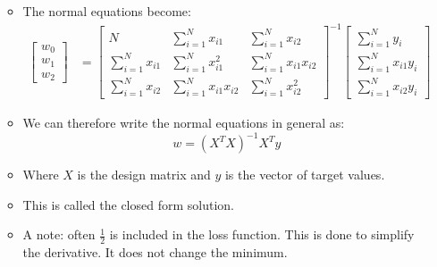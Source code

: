 \documentclass[12pt]{article}
\begin{document}
\begin{itemize}
\begin{itemize}
\begin{equation}
                        \end{equation}
                        \item The normal equations become:
                        \begin{align*}
                            \begin{bmatrix}
                                w_0\\
                                w_1\\
                                w_2
                            \end{bmatrix} &= \begin{bmatrix}
                                N & \sum_{i=1}^N x_{i1} & \sum_{i=1}^N x_{i2}\\
                                \sum_{i=1}^N x_{i1} & \sum_{i=1}^N x_{i1}^2 & \sum_{i=1}^N x_{i1}x_{i2}\\
                                \sum_{i=1}^N x_{i2} & \sum_{i=1}^N x_{i1}x_{i2} & \sum_{i=1}^N x_{i2}^2
                            \end{bmatrix}^{-1} \begin{bmatrix}
                                \sum_{i=1}^N y_i\\
                                \sum_{i=1}^N {x_{i1}}y_i\\
                                \sum_{i=1}^N {x_{i2}}y_i
                            \end{bmatrix}
                        \end{align*}
                        \item We can therefore write the normal equations in general as:
                        \begin{equation}
                            w = {({X^T}X)}^{-1}{X^T}y
                        \end{equation}
                        \item Where $X$ is the design matrix and $y$ is the vector of target values.
                        \item This is called the closed form solution.
                        \item A note: often $\frac{1}{2}$ is included in the loss function. This is done to simplify the derivative. It does not change the minimum.
                    \end{itemize}

\end{itemize}
\end{document}
